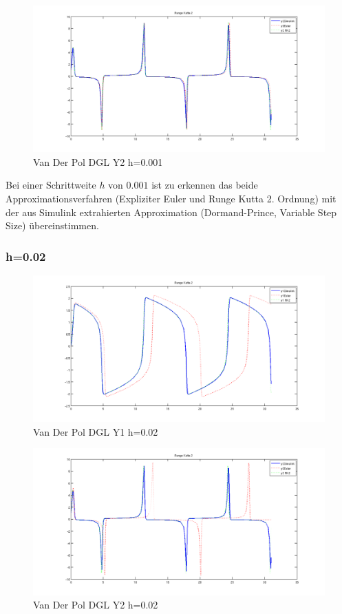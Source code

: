 \documentclass[10pt]{scrartcl}
\begin{document}
		\begin{figure}[H]
			\centering	
			\includegraphics[width=\textwidth]{vanDerPolY20001.png}
            \caption{Van Der Pol DGL Y2 h=0.001}
            \label{pic:y2vdp0001}
		\end{figure}		
		
	Bei einer Schrittweite $h$ von $0.001$ ist zu erkennen das beide Approximationsverfahren (Expliziter Euler und Runge Kutta 2. Ordnung) mit der aus Simulink extrahierten Approximation (Dormand-Prince, Variable Step Size) übereinstimmen.
		
	\subsubsection{h=0.02}	
		\begin{figure}[H]
			\centering	
			\includegraphics[width=\textwidth]{vanDerPolY102.png}
            \caption{Van Der Pol DGL Y1 h=0.02}
            \label{pic:y2vdp02}
		\end{figure} 
		
		\begin{figure}[H]
			\centering	
			\includegraphics[width=\textwidth]{vanDerPolY202.png}
            \caption{Van Der Pol DGL Y2 h=0.02}
            \label{pic:y2vdp02}
		\end{figure}		
		
\end{document}

